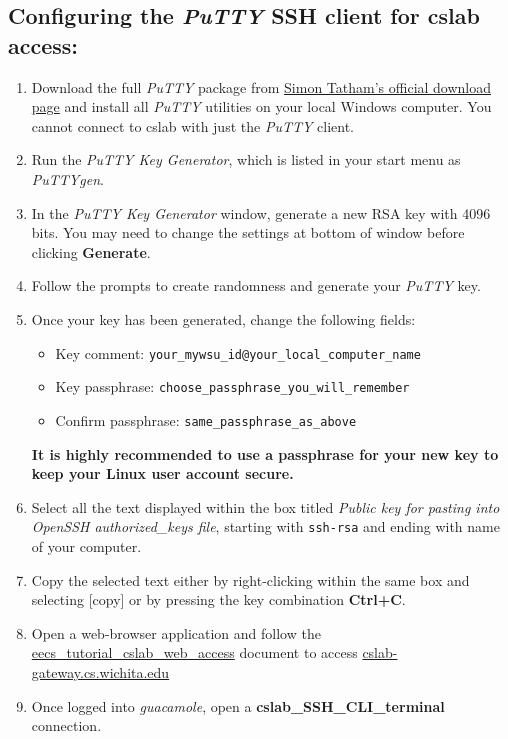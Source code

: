\documentclass[12pt]{article}
\begin{document}
\begin{flushleft}
\subsection*{Configuring the \textit{PuTTY} SSH client for cslab access:}
\begin{enumerate}
  \item Download the full \textit{PuTTY} package from \href{https://www.chiark.greenend.org.uk/~sgtatham/putty/latest.html}{Simon Tatham's official download page} and install all \textit{PuTTY} utilities on your local Windows computer. You cannot connect to cslab with just the \textit{PuTTY} client.
  \item Run the \textit{PuTTY Key Generator}, which is listed in your start menu as \textit{PuTTYgen}.
  \item In the \textit{PuTTY Key Generator} window, generate a new RSA key with 4096 bits. You may need to change the settings at bottom of window before clicking \textbf{Generate}.
  \item Follow the prompts to create randomness and generate your \textit{PuTTY} key.
  \item Once your key has been generated, change the following fields:
    \begin{itemize}
    \item Key comment: \verb|your_mywsu_id@your_local_computer_name|
    \item Key passphrase: \verb|choose_passphrase_you_will_remember|
    \item Confirm passphrase: \verb|same_passphrase_as_above|
    \end{itemize}
    \textbf{It is highly recommended to use a passphrase for your new key to keep your Linux user account secure.}
  \item Select all the text displayed within the box titled \textit{Public key for pasting into OpenSSH authorized\_keys file}, starting with \texttt{ssh-rsa} and ending with name of your computer.
  \item Copy the selected text either by right-clicking within the same box and selecting [copy] or by pressing the key combination \textbf{Ctrl+C}.
  \item Open a web-browser application and follow the \href{https://github.com/benroose/tutorials/blob/master/cslab_tutorials/eecs_tutorial_cslab_web_access.pdf}{eecs\_tutorial\_cslab\_web\_access} document to access \href{https://cslab-gateway.cs.wichita.edu/}{cslab-gateway.cs.wichita.edu}
  \item Once logged into \textit{guacamole}, open a \textbf{cslab\_SSH\_CLI\_terminal} connection.

\end{enumerate}
\end{flushleft}
\end{document}

